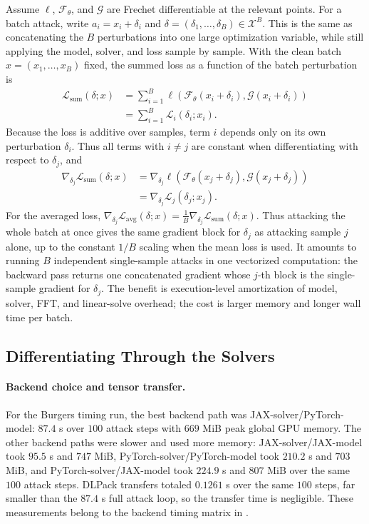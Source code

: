 Assume $\ell$, $\mathcal{F}_\theta$, and $\mathcal{G}$ are Frechet
differentiable at the relevant points. For a batch attack, write
$a_i=x_i+\delta_i$ and
\(\delta=(\delta_1,\ldots,\delta_B)\in\mathcal X^B\). This is the same as
concatenating the \(B\) perturbations into one large optimization variable,
while still applying the model, solver, and loss sample by sample. With the
clean batch \(x=(x_1,\ldots,x_B)\) fixed, the summed loss as a function of the
batch perturbation is
\begin{align}
  \mathcal L_{\mathrm{sum}}(\delta;x)
  &=
  \sum_{i=1}^{B}
  \ell\!\left(
    \mathcal{F}_\theta(x_i+\delta_i),
    \mathcal{G}(x_i+\delta_i)
  \right)
  \nonumber\\
  &=
  \sum_{i=1}^{B}\mathcal L_i(\delta_i;x_i).
\end{align}
Because the loss is additive over samples, term \(i\) depends only on its own
perturbation \(\delta_i\). Thus all terms with \(i\ne j\) are constant when
differentiating with respect to \(\delta_j\), and
\begin{align}
  \nabla_{\delta_j}\mathcal L_{\mathrm{sum}}(\delta;x)
  &=
  \nabla_{\delta_j}
  \ell\!\left(
    \mathcal{F}_\theta(x_j+\delta_j),
    \mathcal{G}(x_j+\delta_j)
  \right)
  \nonumber\\
  &=
  \nabla_{\delta_j}\mathcal L_j(\delta_j;x_j).
\end{align}
For the averaged loss,
\(\nabla_{\delta_j}\mathcal L_{\mathrm{avg}}(\delta;x)
=\frac{1}{B}\nabla_{\delta_j}\mathcal L_{\mathrm{sum}}(\delta;x)\).
Thus attacking the whole batch at once gives the same gradient block for
\(\delta_j\) as attacking sample \(j\) alone, up to the constant $1/B$ scaling
when the mean loss is used. It amounts to running \(B\) independent
single-sample attacks in one vectorized computation: the backward pass returns
one concatenated gradient whose \(j\)-th block is the single-sample gradient for
\(\delta_j\). The benefit is execution-level amortization of model, solver, FFT,
and linear-solve overhead; the cost is larger memory and longer wall time per
batch.

\subsection*{Differentiating Through the Solvers}

\paragraph{Backend choice and tensor transfer.}
For the Burgers timing run, the best backend path was JAX-solver/PyTorch-model:
$87.4$ s over $100$ attack steps with $669$ MiB peak global GPU memory. The
other backend paths were slower and used more memory: JAX-solver/JAX-model took
$95.5$ s and $747$ MiB, PyTorch-solver/PyTorch-model took $210.2$ s and $703$
MiB, and PyTorch-solver/JAX-model took $224.9$ s and $807$ MiB over the same
$100$ attack steps. DLPack transfers totaled $0.1261$ s over the same $100$
steps, far smaller than the $87.4$ s full attack loop, so the transfer time is
negligible. These measurements belong to the backend timing matrix in
.

